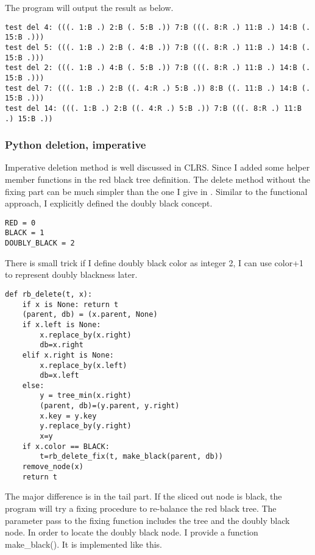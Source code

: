 \documentclass{article}
\begin{document}
The program will output the result as below.

\begin{verbatim}
test del 4: (((. 1:B .) 2:B (. 5:B .)) 7:B (((. 8:R .) 11:B .) 14:B (. 15:B .)))
test del 5: (((. 1:B .) 2:B (. 4:B .)) 7:B (((. 8:R .) 11:B .) 14:B (. 15:B .)))
test del 2: (((. 1:B .) 4:B (. 5:B .)) 7:B (((. 8:R .) 11:B .) 14:B (. 15:B .)))
test del 7: (((. 1:B .) 2:B ((. 4:R .) 5:B .)) 8:B ((. 11:B .) 14:B (. 15:B .)))
test del 14: (((. 1:B .) 2:B ((. 4:R .) 5:B .)) 7:B (((. 8:R .) 11:B .) 15:B .))
\end{verbatim}

\subsubsection*{Python deletion, imperative}

Imperative deletion method is well discussed in CLRS. Since I added some helper member functions
in the red black tree definition. The delete method without the fixing part can be much simpler
than the one I give in \cite{bst-lxy}. Similar to the functional approach, I explicitly defined
the doubly black concept.

\lstset{language=Python}
\begin{lstlisting}
RED = 0
BLACK = 1
DOUBLY_BLACK = 2
\end{lstlisting}

There is small trick if I define doubly black color as integer 2, I can use color+1 to represent
doubly blackness later.

\lstset{language=Python}
\begin{lstlisting}
def rb_delete(t, x):
    if x is None: return t
    (parent, db) = (x.parent, None)
    if x.left is None:
        x.replace_by(x.right)
        db=x.right
    elif x.right is None:
        x.replace_by(x.left)
        db=x.left
    else:
        y = tree_min(x.right)
        (parent, db)=(y.parent, y.right)
        x.key = y.key
        y.replace_by(y.right)
        x=y
    if x.color == BLACK:
        t=rb_delete_fix(t, make_black(parent, db))
    remove_node(x)
    return t
\end{lstlisting}

The major difference is in the tail part. If the sliced out node is black, the program will
try a fixing procedure to re-balance the red black tree. The parameter pass to the fixing
function includes the tree and the doubly black node. In order to locate the doubly black
node. I provide a function make\_black(). It is implemented like this.
\end{document}
